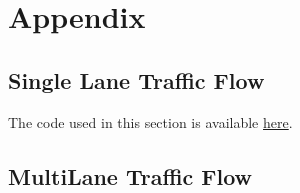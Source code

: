 \documentclass{article}
\begin{document}



\section*{Appendix}
\subsection*{Single Lane Traffic Flow}
The code used in this section is available \href{https://github.com/thetruejacob/CS166/blob/master/Nagel-Schrankenberg%20Model.ipynb}{here}.\\

\subsection*{MultiLane Traffic Flow}
\end{document}
